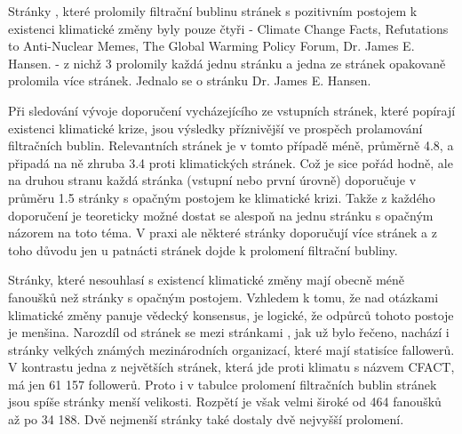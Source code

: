     Stránky , které prolomily filtrační bublinu stránek s pozitivním postojem k existenci klimatické změny byly pouze čtyři - Climate Change Facts, Refutations to Anti-Nuclear Memes, The Global Warming Policy Forum, Dr. James E. Hansen. - z nichž 3 prolomily každá jednu stránku  a jedna ze stránek opakovaně prolomila více stránek. Jednalo se o stránku Dr. James E. Hansen. 
    
    Při sledování vývoje doporučení vycházejícího ze vstupních stránek, které popírají existenci klimatické krize, jsou výsledky příznivější ve prospěch prolamování filtračních bublin. Relevantních stránek je v tomto případě méně, průměr\-ně 4.8, a připadá na ně zhruba 3.4 proti klimatických stránek. Což je sice pořád hodně, ale na druhou stranu každá stránka (vstupní nebo první úrovně) doporučuje v průměru 1.5 stránky s opačným postojem ke klimatické krizi. Takže z každého doporučení je teoreticky možné dostat se alespoň na jednu stránku s opačným názorem na toto téma. V praxi ale některé stránky  doporučují více stránek  a z toho důvodu jen u patnácti stránek  dojde k prolomení filtrační bubliny.
    
    Stránky, které nesouhlasí s existencí klimatické změny mají obecně méně fanoušků než stránky s opačným postojem. Vzhledem k tomu, že nad otázkami klimatické změny panuje vědecký konsensus, je logické, že odpůrců tohoto postoje je menšina. Narozdíl od stránek  se mezi stránkami , jak už bylo řečeno, nachází i stránky velkých známých mezinárodních organizací, které mají statisíce fallowerů. V kontrastu jedna z největších stránek, která jde proti klimatu s názvem CFACT, má jen 61 157 followerů. Proto i v tabulce prolomení filtračních bublin stránek  jsou spíše stránky menší velikosti. Rozpětí je však velmi široké od 464 fanoušků až po 34 188. Dvě nejmenší stránky také dostaly dvě nejvyšší prolomení. 
    
    \setlength{\arrayrulewidth}{0.5mm}
    \setlength{\tabcolsep}{60pt}
    \renewcommand{\arraystretch}{1.5} 
    
